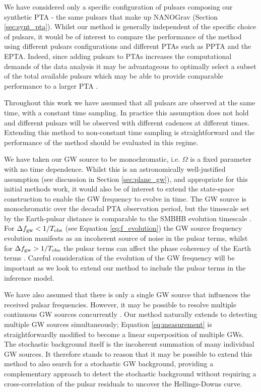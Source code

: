 \documentclass[fleqn,usenatbib,useAMS]{mnras}
\begin{document}
We have considered only a specific configuration of pulsars composing our synthetic PTA - the same pulsars that make up NANOGrav (Section \ref{sec:synt_pta}). Whilst our method is generally independent of the specific choice of pulsars, it would be of interest to compare the performance of the method using different pulsars configurations and different PTAs such as PPTA and the EPTA. Indeed, since adding pulsars to PTAs increases the computational demands of the data analysis it may be advantageous to optimally select a subset of the total available pulsars which may be able to provide comparable performance to a larger PTA  \citep{2023MNRAS.518.1802S}.  \newline 

Throughout this work we have assumed that all pulsars are observed at the same time, with a constant time sampling. In practice this assumption does not hold and different pulsars will be observed with different cadences at different times. Extending this method to non-constant time sampling is straightforward and the performance of the method should be evaluated in this regime. \newline 

We have taken our GW source to be monochromatic, i.e. $\Omega$ is a fixed parameter with no time dependence. Whilst this is an astronomically well-justified assumption (see discussion in Section \ref{sec:plane_gw}), and appropriate for this initial methods work, it would also be of interest to extend the state-space construction to enable the GW frequency to evolve in time. The GW source is monochromatic over the decadal PTA observation period, but the timescale set by the Earth-pulsar distance is comparable to the SMBHB evolution timescale \citep{Sesana2010}. For $\Delta f_{\rm gw} < 1 / T_{\rm obs}$ (see Equation \eqref{eq:f_evolution}) the GW source frequency evolution manifests as an incoherent source of noise in the pulsar terms, whilst for  $\Delta f_{\rm gw} > 1 / T_{\rm obs}$ the pulsar terms can affect the phase coherency of the Earth terms \citep{Perrodin2018}. Careful consideration of the evolution of the GW frequency will be important as we look to extend our method to include the pulsar terms in the inference model. \newline 


We have also assumed that there is only a single GW source that influences the received pulsar frequencies. However, it may be possible to resolve multiple continuous GW sources concurrently \citep{PhysRevD.85.044034}. Our method naturally extends to detecting multiple GW sources simultaneously; Equation \eqref{eq:measurement} is straightforwardly modified to become a linear superposition of multiple GWs. The stochastic background itself is the incoherent summation of many individual GW sources. It therefore stands to reason that it may be possible to extend this method to also search for a stochastic GW background, providing a complementary approach to detect the stochastic background without requiring a cross-correlation of the pulsar residuals to uncover the Hellings-Downs curve. \newline 
\end{document}
